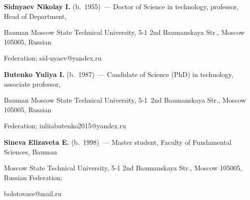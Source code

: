 \vspace*{-12pt}  



\Contr



\vspace*{-4pt}



\noindent

\textbf{Sidnyaev Nikolay I.} (b.\ 1955)~--- Doctor of Science in technology, professor, Head of Department, 

Bauman Moscow State Technical University, 5-1 2nd Baumanskaya Str., Moscow 105005, Russian 

Federation; \mbox{sid-nyaev@yandex.ru}



\vspace*{3pt}



\noindent

\textbf{Butenko Yuliya I.} (b.\ 1987)~--- Candidate of Science (PhD) in technology, associate professor, 

Bauman Moscow State Technical University, 5-1~2nd Baumanskaya Str., Moscow 105005, Russian 

Federation; \mbox{iuliiabutenko2015@yandex.ru}



\vspace*{3pt}



\noindent

\textbf{Sineva Elizaveta E.} (b.\ 1998)~--- Master student, Faculty of Fundamental Sciences, Bauman 

Moscow State Technical University, 5-1 2nd Baumanskaya Str., Moscow 105005, Russian Federation; 

\mbox{bolotovaee@mail.ru}





\label{end\stat}



\renewcommand{\bibname}{\protect\rm Литература} 

